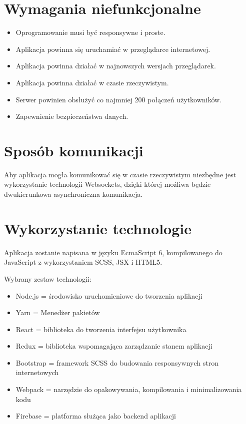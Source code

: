 \section{Wymagania niefunkcjonalne}

\begin{itemize}
    \item Oprogramowanie musi być responsywne i proste.
    \item Aplikacja powinna się uruchamiać w przeglądarce internetowej.
    \item Aplikacja powinna działać w najnowszych wersjach przeglądarek.
    \item Aplikacja powinna działać w czasie rzeczywistym.
    \item Serwer powinien obsłużyć co najmniej 200 połączeń użytkowników.
    \item Zapewnienie bezpieczeństwa danych.
\end{itemize}

\section{Sposób komunikacji}

Aby aplikacja mogła komunikować się w czasie rzeczywistym niezbędne jest wykorzystanie
technologii Websockets, dzięki której możliwa będzie dwukierunkowa asynchroniczna komunikacja.

\section{Wykorzystanie technologie}

Aplikacja zostanie napisana w języku EcmaScript 6, kompilowanego do JavaScript
z wykorzystaniem SCSS, JSX i HTML5.

Wybrany zestaw technologii:
\begin{itemize}
    \item Node.js = środowisko uruchomieniowe do tworzenia aplikacji
    \item Yarn = Menedżer pakietów
    \item React =  biblioteka do tworzenia interfejsu użytkownika
    \item Redux = biblioteka wspomagająca zarządzanie stanem aplikacji
    \item Bootstrap = framework SCSS do budowania responsywnych stron internetowych
    \item Webpack = narzędzie do opakowywania, kompilowania i minimalizowania kodu
    \item Firebase = platforma służąca jako backend aplikacji
\end{itemize}

